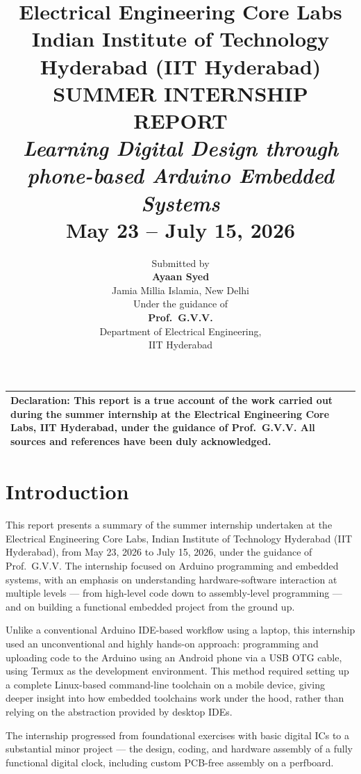 \documentclass[12pt,a4paper]{report}
\title{
    \vspace{-1.5cm}
    {\Large\textbf{Electrical Engineering Core Labs}}\\[0.3em]
    {\large Indian Institute of Technology Hyderabad (IIT Hyderabad)}\\[1.5em]
    {\Huge\textbf{SUMMER INTERNSHIP REPORT}}\\[0.8em]
    {\Large\textit{Learning Digital Design through\\phone-based Arduino Embedded Systems}}\\[1.5em]
    {\large May 23 -- July 15, 2026}
}
\author{
    Submitted by\\[0.5em]
    \textbf{Ayaan Syed}\\
    Jamia Millia Islamia, New Delhi\\[1.5em]
    Under the guidance of\\[0.5em]
    \textbf{Prof.\ G.V.V.}\\
    Department of Electrical Engineering,\\
    IIT Hyderabad
}
\date{}
\begin{document}
\maketitle
\thispagestyle{empty}

\vspace{2cm}
\begin{center}
\begin{tabular}{@{}p{}@{}}
\hline
\vspace{0.3em}
\textbf{Declaration:} This report is a true account of the work carried out during the summer internship at the Electrical Engineering Core Labs, IIT Hyderabad, under the guidance of Prof.\ G.V.V. All sources and references have been duly acknowledged.\\[0.5em]
\hline
\end{tabular}
\end{center}

\clearpage
\tableofcontents
\clearpage
{}

\chapter{Introduction}
\label{ch:intro}

This report presents a summary of the summer internship undertaken at the Electrical Engineering Core Labs, Indian Institute of Technology Hyderabad (IIT Hyderabad), from May 23, 2026 to July 15, 2026, under the guidance of Prof.\ G.V.V. The internship focused on Arduino programming and embedded systems, with an emphasis on understanding hardware-software interaction at multiple levels --- from high-level code down to assembly-level programming --- and on building a functional embedded project from the ground up.

Unlike a conventional Arduino IDE-based workflow using a laptop, this internship used an unconventional and highly hands-on approach: programming and uploading code to the Arduino using an Android phone via a USB OTG cable, using Termux as the development environment. This method required setting up a complete Linux-based command-line toolchain on a mobile device, giving deeper insight into how embedded toolchains work under the hood, rather than relying on the abstraction provided by desktop IDEs.

The internship progressed from foundational exercises with basic digital ICs to a substantial minor project --- the design, coding, and hardware assembly of a fully functional digital clock, including custom PCB-free assembly on a perfboard.
\end{document}
